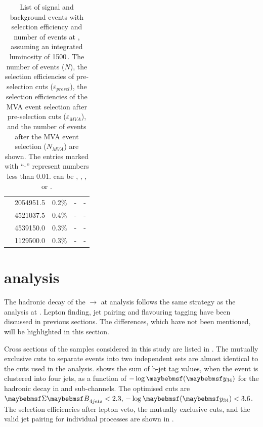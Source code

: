 \begin{table}[!htbp]
\begin{tabular}{lrrrr}
\hline
\gammagamma{\Pphoton}{\BS}{\Pphoton}{\BS}{ \Pquark \Pquark \Pquark \Pquark}& 2054951.5  & 0.2\%&  - & -\\
\gammagamma{\Pphoton}{\BS}{\Pphoton}{\EPA}{ \Pquark \Pquark \Pquark \Pquark}& 4521037.5  & 0.4\%& - & - \\
\gammagamma{\Pphoton}{\EPA}{\Pphoton}{\BS}{ \Pquark \Pquark \Pquark \Pquark}& 4539150.0 & 0.3\%&  - & - \\
\gammagamma{\Pphoton}{\EPA}{\Pphoton}{\EPA}{ \Pquark \Pquark \Pquark \Pquark}& 1129500.0 & 0.3\% & - & -\\
\hline \hline
\end{tabular}

\caption[Selection efficiency and number of events for signal and background at .]%
{List of signal and background events with selection efficiency and number of events at , assuming  an integrated luminosity  of 1500\,. The number of events ($N$), the selection efficiencies of pre-selection cuts ($\varepsilon_{presel}$), the selection efficiencies of the MVA event selection after pre-selection cuts ($\varepsilon_{MVA}$), and the number of events after the MVA event selection ($N_{MVA}$) are shown. The entries marked with ``-'' represent  numbers less than 0.01. \Pquark can be \Pup, \Pdown, \Pstrange, \Pbottom or \Ptop.}
\label{tab:doubleHiggs1.4TeVMVA}
\end{table}



\section{ analysis}

The hadronic \WW decay of the \eeToHH $\to$ \HepProcess{ \Pbottom \APbottom \PWplus \PWminus \Pnu \APnu} at  analysis follows the same strategy as the analysis at . Lepton finding, jet pairing and flavouring tagging have been discussed in previous sections. The differences, which have not been mentioned, will be highlighted in this section.

Cross sections of the  samples considered in this study are listed in . The mutually exclusive cuts to separate events into two independent sets are almost identical to the cuts used in the  analysis.  shows the sum of b-jet tag values, when the event is clustered into four jets, as a function of $-\log\parenths{\y{34}}$ for the hadronic \WW decay in \eeToHHbbWW and \eeToHHbbbb sub-channels. The optimised cuts are  $\sumBtag{4} < 2.3, \, -\log\parenths{\y{34}} < 3.6$. The selection efficiencies after lepton veto, the  mutually exclusive cuts,  and the valid jet pairing for individual processes are shown in .

